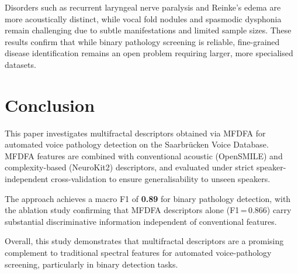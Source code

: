 \documentclass[conference]{IEEEtran}
\begin{document}
  Disorders such as recurrent laryngeal nerve paralysis and Reinke's edema are more acoustically distinct, while vocal fold nodules and spasmodic dysphonia remain challenging due to subtle manifestations and limited sample sizes. These results confirm that while binary pathology screening is reliable, fine-grained disease identification remains an open problem requiring larger, more specialised datasets.


  \section{Conclusion}
  \label{sec:conclusion}

  This paper investigates multifractal descriptors obtained via MFDFA for automated voice pathology detection on the Saarbrücken Voice Database. MFDFA features are combined with conventional acoustic (OpenSMILE) and complexity-based (NeuroKit2) descriptors, and evaluated under strict speaker-independent cross-validation to ensure generalisability to unseen speakers.

  The approach achieves a macro F1 of \textbf{0.89} for binary pathology detection, with the ablation study confirming that MFDFA descriptors alone (F1\,=\,0.866) carry substantial discriminative information independent of conventional features.

  Overall, this study demonstrates that multifractal descriptors are a promising complement to traditional spectral features for automated voice-pathology screening, particularly in binary detection tasks.
\end{document}
